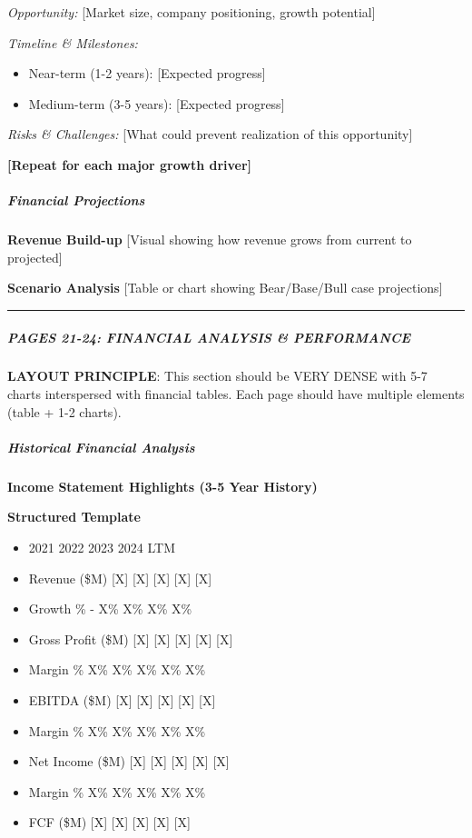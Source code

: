 \documentclass[11pt]{article}
\begin{document}
\emph{Opportunity:} [Market size, company positioning, growth potential]


\emph{Timeline \& Milestones:}

\begin{itemize}[leftmargin=*,itemsep=2pt,topsep=2pt]
\item {} Near-term (1-2 years): [Expected progress]
\item {} Medium-term (3-5 years): [Expected progress]
\end{itemize}

\emph{Risks \& Challenges:} [What could prevent realization of this opportunity]


\textbf{[Repeat for each major growth driver]}


\subparagraph{Financial Projections}\mbox{}\par

\textbf{Revenue Build-up} [Visual showing how revenue grows from current to projected]


\textbf{Scenario Analysis} [Table or chart showing Bear/Base/Bull case projections]


\vspace{0.5em}\hrule\vspace{0.5em}

\subparagraph{PAGES 21-24: FINANCIAL ANALYSIS \& PERFORMANCE}\mbox{}\par

\textbf{LAYOUT PRINCIPLE}: This section should be VERY DENSE with 5-7 charts interspersed with financial tables. Each page should have multiple elements (table + 1-2 charts).


\subparagraph{Historical Financial Analysis}\mbox{}\par

\textbf{Income Statement Highlights (3-5 Year History)}

\textbf{Structured Template}
\begin{itemize}[leftmargin=*,itemsep=2pt,topsep=2pt]
\item {} 2021 2022 2023 2024 LTM
\item {} Revenue (\$M) [X] [X] [X] [X] [X]
\item {} Growth \% - X\% X\% X\% X\%
\item {} Gross Profit (\$M) [X] [X] [X] [X] [X]
\item {} Margin \% X\% X\% X\% X\% X\%
\item {} EBITDA (\$M) [X] [X] [X] [X] [X]
\item {} Margin \% X\% X\% X\% X\% X\%
\item {} Net Income (\$M) [X] [X] [X] [X] [X]
\item {} Margin \% X\% X\% X\% X\% X\%
\item {} FCF (\$M) [X] [X] [X] [X] [X]
\end{itemize}
\end{document}
